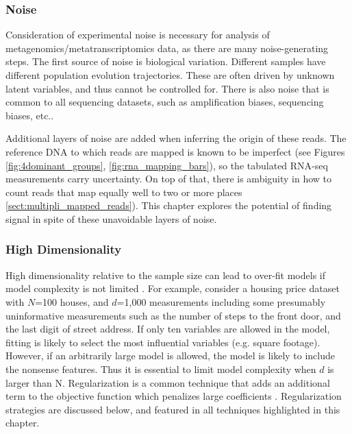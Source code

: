 \subsubsection{Noise}
Consideration of experimental noise is necessary for analysis of metagenomics/metatranscriptomics data, as there are many noise-generating steps.
The first source of noise is biological variation.
Different samples have different population evolution trajectories.
These are often driven by unknown latent variables, and thus cannot be controlled for.
There is also noise that is common to all sequencing datasets, such as amplification biases, sequencing biases, etc..

Additional layers of noise are added when inferring the origin of these reads.
The reference DNA to which reads are mapped is known to be imperfect (see Figures \ref{fig:4dominant_groups}, \ref{fig:rna_mapping_bars}), so the tabulated RNA-seq measurements carry uncertainty.
On top of that, there is ambiguity in how to count reads that map equally well to two or more places \ref{sect:multipli_mapped_reads}).
This chapter explores the potential of finding signal in spite of these unavoidable layers of noise.

\subsubsection{High Dimensionality}
High dimensionality relative to the sample size can lead to over-fit models if model complexity is not limited \cite{friedman2001}. %
For example, consider a housing price dataset with $N$=100 houses, and $d$=1,000 measurements including some presumably uninformative measurements such as the number of steps to the front door, and the last digit of street address.
If only ten variables are allowed in the model, fitting is likely to select the most influential variables (e.g. square footage).
However, if an arbitrarily large model is allowed, the model is likely to include the nonsense features.
Thus it is essential to limit model complexity when $d$ is larger than N.
Regularization is a common technique that adds an additional term to the objective function which penalizes large coefficients \cite{friedman2001}.
Regularization strategies are discussed below, and featured in all techniques highlighted in this chapter.

